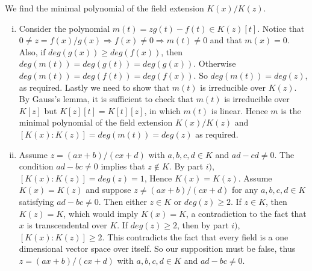\begin{solution} 
	We find the minimal polynomial of the field extension $K(x)/K(z)$.
	\begin{enumerate}[(i)]

		\item Consider the polynomial $m(t) = zg(t) - f(t) \in K(z)[t]$. 
		Notice that $0 \neq z = f(x)/g(x) \Longrightarrow f(x) \neq 0 \Longrightarrow m(t) \neq 0$
		and that $m(x) = 0$. Also, if $deg(g(x)) \geq deg(f(x))$, 
		then $deg(m(t)) = deg(g(t)) = deg(g(x))$.
		Otherwise $deg(m(t)) = deg(f(t)) = deg(f(x))$. So $deg(m(t)) = deg(z)$,
		as required. Lastly we need to show that $m(t)$ is irreducible over
		$K(z)$. By Gauss's lemma, it is sufficient to check that $m(t)$ is 
		irreducible over $K[z]$ but $K[z][t]=K[t][z]$, in which $m(t)$ is linear. 
		Hence $m$ is the minimal polynomial of the field extension $K(x)/K(z)$ 
		and $[K(x):K(z)] = deg(m(t)) = deg(z)$ as required.

		\item Assume $z = (ax+b)/(cx + d)$ with $a,b,c,d \in K$ and 
		$ad - cd \neq 0$. The condition $ad-bc \neq 0 $ implies that 
		$z \notin K$. By part $i)$, $[K(x):K(z)] = deg(z) = 1$, Hence 
		$K(x) = K(z)$. Assume $K(x) = K(z)$ and suppose $z \neq (ax+b)/(cx + d) $ 
		for any $a,b,c,d \in K$ satisfying $ad - bc \neq 0$. Then 
		either $z \in K$ or $deg(z) \geq 2$. If $z \in K$, then $K(z) = K$, 
		which would imply $K(x) = K$, a contradiction to the fact 
		that $x$ is transcendental over $K$. If $deg(z) \geq 2$, 
		then by part $i)$, $[K(x):K(z)] \geq 2$. This contradicts the fact 
		that every field is a one dimensional vector space over itself. 
		So our supposition must be false, thus $z = (ax+b)/(cx+d)$ with 
		$a,b,c,d \in K$ and $ad - bc \neq 0$.
	\end{enumerate}
\end{solution}

